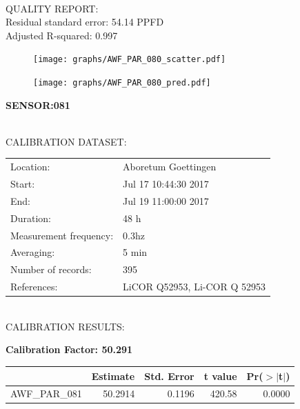 \documentclass[oneside]{report}
\begin{document}
\hrulefill\\
QUALITY REPORT:\\
Residual standard error: 54.14 PPFD\\
Adjusted R-squared: 0.997



\begin{figure}[H]
  \centering
  \texttt{[image: graphs/AWF\_PAR\_080\_scatter.pdf]}
\end{figure}




\begin{figure}[H]
  \centering
  \texttt{[image: graphs/AWF\_PAR\_080\_pred.pdf]}
\end{figure}

\pagebreak


\begin{center}
\large{\textbf{SENSOR:081}}\\
\end{center}

\hrulefill\\
CALIBRATION DATASET:\\
\begin{table}[h!]
  \centering
  \label{tab:table1}
  \begin{tabular}{ll}
    Location: & Aboretum Goettingen\\ 
    
    
    Start:  & Jul 17 10:44:30 2017 \\
    End:   & Jul 19 11:00:00 2017\\ 
    Duration: & 48 h\\
    Measurement frequency: & 0.3hz\\
    Averaging:  &5 min\\
    Number of records: & 395 \\
    References: & LiCOR Q52953, Li-COR Q 52953 \\
  \end{tabular}
\end{table}

\hrulefill\\
CALIBRATION RESULTS:\\


\begin{center}
\textbf{\large{Calibration Factor: 50.291}}\\
\end{center}
\begin{table}[ht]
\centering
\begin{tabular}{rrrrr}
  \hline
 & Estimate & Std. Error & t value & Pr($>$$|$t$|$) \\ 
  \hline
AWF\_PAR\_081 & 50.2914 & 0.1196 & 420.58 & 0.0000 \\ 
   \hline
\end{tabular}
\end{table}
\end{document}
